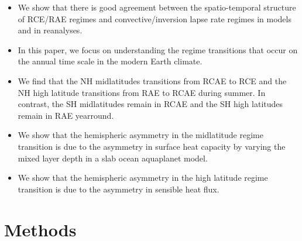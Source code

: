 \documentclass{ametsocV5}
\begin{document}
\begin{itemize}
  \item We show that there is good agreement between the spatio-temporal structure of RCE/RAE regimes and convective/inversion lapse rate regimes in models and in reanalyses.
  \item In this paper, we focus on understanding the regime transitions that occur on the annual time scale in the modern Earth climate.
  \item We find that the NH midlatitudes transitions from RCAE to RCE and the NH high latitude transitions from RAE to RCAE during summer. In contrast, the SH midlatitudes remain in RCAE and the SH high latitudes remain in RAE yearround.
  \item We show that the hemispheric asymmetry in the midlatitude regime transition is due to the asymmetry in surface heat capacity by varying the mixed layer depth in a slab ocean aquaplanet model.
  \item We show that the hemispheric asymmetry in the high latitude regime transition is due to the asymmetry in sensible heat flux.
\end{itemize}

\section{Methods}
\end{document}
